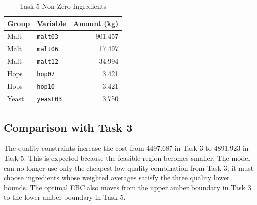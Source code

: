 \begin{table}[H]
\renewcommand{\arraystretch}{1.15}
\caption{Task 5 Non-Zero Ingredients}
\label{tab:task35-ingredients}
\centering
\small
\begin{tabular}{@{}llr@{}}
\toprule
Group & Variable & Amount (kg) \\
\midrule
Malt & \texttt{malt03} & 901.457 \\
Malt & \texttt{malt06} & 17.497 \\
Malt & \texttt{malt12} & 34.994 \\
Hops & \texttt{hop07} & 3.421 \\
Hops & \texttt{hop10} & 3.421 \\
Yeast & \texttt{yeast03} & 3.750 \\
\bottomrule
\end{tabular}
\end{table}

\subsection{Comparison with Task 3}
\label{sec:task5-comparison}
The quality constraints increase the cost from 4497.687 in Task 3 to 4891.923 in Task 5. This is expected because the feasible region becomes smaller. The model can no longer use only the cheapest low-quality combination from Task 3; it must choose ingredients whose weighted averages satisfy the three quality lower bounds. The optimal EBC also moves from the upper amber boundary in Task 3 to the lower amber boundary in Task 5.

